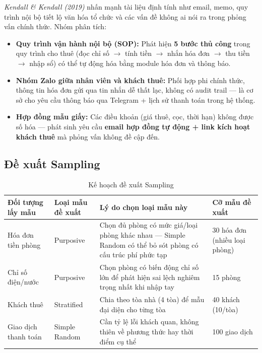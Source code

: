 \documentclass[12pt,a4paper]{report}
\begin{document}
\emph{Kendall \& Kendall (2019)} nhấn mạnh tài liệu định tính như email, memo, quy trình nội bộ tiết lộ văn hóa tổ chức và các vấn đề không ai nói ra trong phỏng vấn chính thức. Nhóm phân tích:

\begin{itemize}[leftmargin=1.2em,itemsep=2pt]
  \item \textbf{Quy trình vận hành nội bộ (SOP):} Phát hiện \textbf{5 bước thủ công} trong quy trình cho thuê (đọc chỉ số $\rightarrow$ tính tiền $\rightarrow$ nhắn hóa đơn $\rightarrow$ thu tiền $\rightarrow$ nhập sổ) có thể tự động hóa bằng module hóa đơn và thông báo.
  \item \textbf{Nhóm Zalo giữa nhân viên và khách thuê:} Phối hợp phi chính thức, thông tin hóa đơn gửi qua tin nhắn dễ thất lạc, không có audit trail --- là cơ sở cho yêu cầu thông báo qua Telegram + lịch sử thanh toán trong hệ thống.
  \item \textbf{Hợp đồng mẫu giấy:} Các điều khoản (giá thuê, cọc, thời hạn) không được số hóa --- phát sinh yêu cầu \textbf{email hợp đồng tự động + link kích hoạt khách thuê} mà phỏng vấn không đề cập đến.
\end{itemize}

\subsection{Đề xuất Sampling}

\begin{table}[H]
  \centering
  \caption{Kế hoạch đề xuất Sampling}
  \label{tab:ig_sampling}
  \begin{tabular}{@{}p{3.4cm}p{2.4cm}p{5.6cm}p{2.6cm}@{}}
    \toprule
    \textbf{Đối tượng lấy mẫu} & \textbf{Loại mẫu đề xuất} & \textbf{Lý do chọn loại mẫu này} & \textbf{Cỡ mẫu đề xuất} \\
    \midrule
    Hóa đơn tiền phòng & Purposive & Chọn đủ phòng có mức giá/loại phòng khác nhau --- Simple Random có thể bỏ sót phòng có cấu trúc phí phức tạp & 30 hóa đơn (nhiều loại phòng) \\
    \addlinespace
    Chỉ số điện/nước & Purposive & Chọn phòng có biến động chỉ số lớn để phát hiện sai lệch nghiêm trọng nhất khi nhập tay & 15 phòng \\
    \addlinespace
    Khách thuê & Stratified & Chia theo tòa nhà (4 tòa) để mẫu đại diện cho từng tòa & 40 khách (10/tòa) \\
    \addlinespace
    Giao dịch thanh toán & Simple Random & Cần tỷ lệ lỗi khách quan, không thiên về phương thức hay thời điểm cụ thể & 100 giao dịch \\
    \bottomrule
  \end{tabular}
\end{table}
\end{document}
